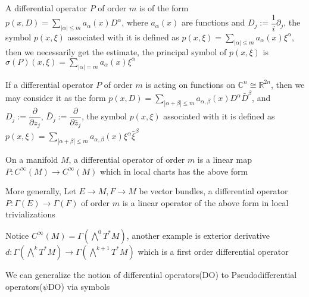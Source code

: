 \documentclass[../main.tex]{subfiles}
\begin{document}
\begin{definition}
A differential operator $P$ of order $m$ is of the form $p(x,D)=\displaystyle\sum_{|\alpha|\leq m}a_\alpha(x)D^\alpha$, where $a_\alpha(x)$ are functions and $D_j:=\dfrac{1}{i}\partial_j$, the symbol $p(x,\xi)$ associated with it is defined as $p(x,\xi)=\displaystyle\sum_{|\alpha|\leq m}a_\alpha(x)\xi^\alpha$, then we necessarily get the estimate, the principal symbol of $p(x,\xi)$ is $\sigma(P)(x,\xi)=\displaystyle\sum_{|\alpha|= m}a_\alpha(x)\xi^\alpha$ \par
If a differential operator $P$ of order $m$  is acting on functions on $\mathbb C^n\cong\mathbb R^{2n}$, then we may consider it as the form $p(x,D)=\displaystyle\sum_{|\alpha+\beta|\leq m}a_{\alpha,\beta}(x)D^\alpha\bar D^\beta$, and $D_j:=\dfrac{\partial}{\partial z_j}$, $\bar D_j:=\dfrac{\partial}{\partial \bar z_j}$, the symbol $p(x,\xi)$ associated with it is defined as $p(x,\xi)=\displaystyle\sum_{|\alpha+\beta|\leq m}a_{\alpha,\beta}(x)\xi^\alpha\bar \xi^\beta$
\end{definition}

\begin{definition}
On a manifold $M$, a differential operator of order $m$ is a linear map $P: C^\infty(M)\rightarrow C^\infty(M)$ which in local charts has the above form \par
More generally, Let $E\to M, F\to M$ be vector bundles, a differential operator $P: \Gamma(E)\rightarrow\Gamma(F)$ of order $m$ is a linear operator of the above form in local trivializations \par
Notice $C^\infty(M)=\Gamma\left(\bigwedge^0T^*M\right)$, another example is exterior derivative $d: \Gamma\left(\bigwedge^kT^*M\right)\to\Gamma\left(\bigwedge^{k+1}T^*M\right)$ which is a first order differential operator
\end{definition}

We can generalize the notion of differential operators(DO) to Pseudodifferential operators($\psi$DO) via symbols \par
\end{document}
